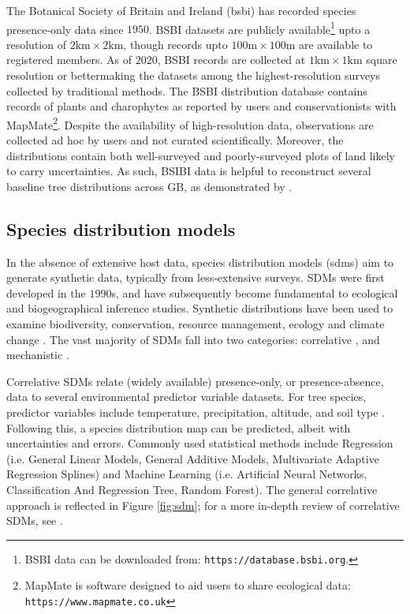 The Botanical Society of Britain and Ireland (\acrshort{bsbi}) has recorded species presence-only data since $1950$.
BSBI datasets are publicly available\footnote{BSBI data can be downloaded from: \nolinkurl{https://database.bsbi.org}.} upto a
resolution of $\mathrm{2 km \times 2km}$, though records upto $\mathrm{100 m \times 100 m}$ are available to registered members.
As of $2020$, BSBI records are collected at $\mathrm{1 km \times 1km}$ square resolution or better\textemdash making the datasets among the 
highest-resolution surveys collected by traditional methods. The BSBI distribution database contains records of plants and charophytes
as reported by users and conservationists with MapMate\footnote{MapMate is software designed to aid users to share ecological data: \nolinkurl{https://www.mapmate.co.uk}}.
Despite the availability of high-resolution data, observations are collected ad hoc by users and not curated scientifically.
Moreover, the distributions contain both well-surveyed and poorly-surveyed plots of land likely to carry uncertainties.
As such, BSIBI data is helpful to reconstruct several baseline tree distributions across GB, as demonstrated by \cite{hill.data}.

\subsection{Species distribution models}

In the absence of extensive host data, species distribution models (\acrshort{sdm}s) aim to generate synthetic data, typically from less-extensive surveys.
SDMs were first developed in the $1990$s, and have subsequently become fundamental to ecological and biogeographical inference studies.
Synthetic distributions have been used to examine biodiversity, conservation, resource management, 
ecology and climate change \cite{franklin2013species, skov2016real, wittmann2016confronting, 10.3958/059.037.0110, zhang2019using}.
The vast majority of SDMs fall into two categories: correlative \cite{srivastava2019species}, and mechanistic \cite{shabani2016comparison}.

Correlative SDMs relate (widely available) presence-only, or presence-absence, data to several environmental predictor variable datasets.
For tree species, predictor variables include temperature, precipitation, altitude, and soil type \cite{ray2021multi, hill.data}.
Following this, a species distribution map can be predicted, albeit with  uncertainties and errors.
Commonly used statistical methods include Regression 
(i.e. General Linear Models, General Additive Models, Multivariate Adaptive Regression Splines) and Machine Learning
(i.e. Artificial Neural Networks, Classification And Regression Tree, Random Forest). 
The general correlative approach is reflected in Figure \ref{fig:sdm}; for a more in-depth review of correlative SDMs, see \cite{SDM_1}.

